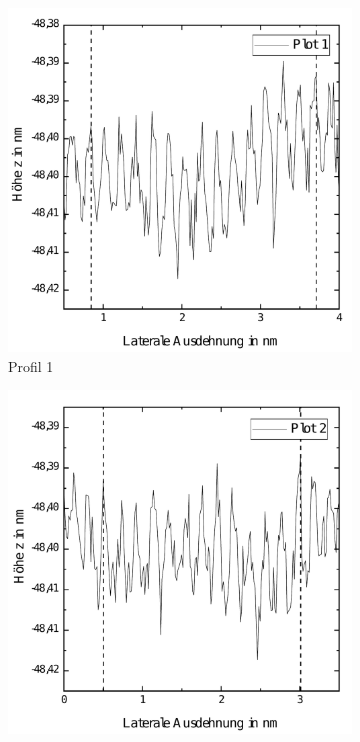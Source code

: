 \documentclass[a4paper,twoside,final]{article}
\begin{document}
\begin{figure}[ht]
    \centering
    \begin{subfigure}{0.3\textwidth}
        \includegraphics[width=\textwidth]{Bilder/Graphen_Profil1.pdf}
        \caption{Profil 1}
    \end{subfigure}
    \hspace{0.5cm}
    \begin{subfigure}{0.3\textwidth}
        \includegraphics[width=\textwidth]{Bilder/Graphen_Profil2.pdf}

\end{subfigure}
\end{figure}
\end{document}
